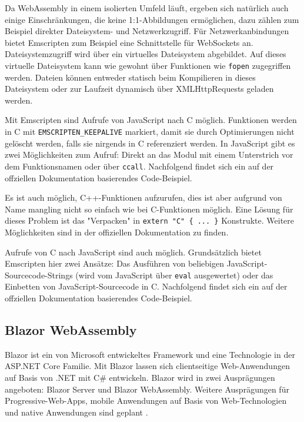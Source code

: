 Da WebAssembly in einem isolierten Umfeld läuft, ergeben sich natürlich auch einige Einschränkungen, die keine 1:1-Abbildungen ermöglichen, dazu zählen zum Beispiel direkter Dateisystem- und Netzwerkzugriff. Für Netzwerkanbindungen bietet Emscripten zum Beispiel eine Schnittstelle für WebSockets an. Dateisystemzugriff wird über ein virtuelles Dateisystem abgebildet. Auf dieses virtuelle Dateisystem kann wie gewohnt über Funktionen wie \lstinline{fopen} zugegriffen werden. Dateien können entweder statisch beim Kompilieren in dieses Dateisystem oder zur Laufzeit dynamisch über XMLHttpRequests geladen werden.

Mit Emscripten sind Aufrufe von JavaScript nach C möglich. Funktionen werden in C mit \lstinline{EMSCRIPTEN_KEEPALIVE} markiert, damit sie durch Optimierungen nicht gelöscht werden, falls sie nirgends in C referenziert werden. In JavaScript gibt es zwei Möglichkeiten zum Aufruf: Direkt an das Modul mit einem Unterstrich vor dem Funktionsnamen oder über \lstinline{ccall}. Nachfolgend findet sich ein auf der offziellen Dokumentation basierendes Code-Beispiel.



Es ist auch möglich, C++-Funktionen aufzurufen, dies ist aber aufgrund von Name mangling nicht so einfach wie bei C-Funktionen möglich. Eine Lösung für dieses Problem ist das "Verpacken" in \lstinline|extern "C" { ... }| Konstrukte. Weitere Möglichkeiten sind in der offiziellen Dokumentation zu finden.

Aufrufe von C nach JavaScript sind auch möglich. Grundsätzlich bietet Emscripten hier zwei Ansätze: Das Ausführen von beliebigen JavaScript-Sourcecode-Strings (wird vom JavaScript über \lstinline{eval} ausgewertet) oder das Einbetten von JavaScript-Sourcecode in C. Nachfolgend findet sich ein auf der offziellen Dokumentation basierendes Code-Beispiel.



\subsection{Blazor WebAssembly}
Blazor \cite{Blazor} ist ein von Microsoft entwickeltes Framework und eine Technologie in der ASP.NET Core Familie. Mit Blazor lassen sich clientseitige Web-Anwendungen auf Basis von .NET mit C\#{} entwickeln. Blazor wird in zwei Ausprägungen angeboten: Blazor Server und Blazor WebAssembly. Weitere Ausprägungen für Progressive-Web-Apps, mobile Anwendungen auf Basis von Web-Technologien und native Anwendungen sind geplant \cite{BlazorBlog}.

